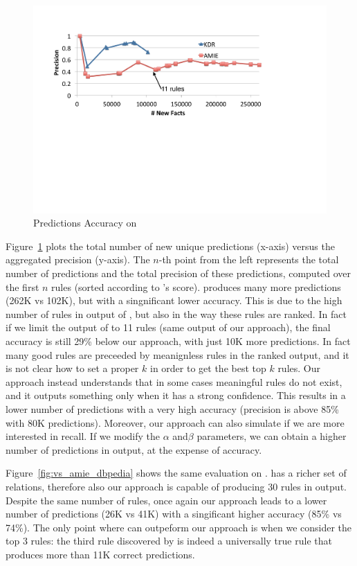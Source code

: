 \begin{figure}[t]
	\centering
	\includegraphics[width=\columnwidth]{include/figure/vsAmieYago.pdf}
	\caption{Predictions Accuracy on \yago}
	\label{fig:vs_amie_yago}
\end{figure}

Figure~\ref{fig:vs_amie_yago} plots the total number of new unique predictions (x-axis) versus the aggregated precision (y-axis). The $n$-th point from the left represents the total number of predictions and the total precision of these predictions, computed over the first $n$ rules (sorted according to \amie's score). \amie produces many more predictions (262K vs 102K), but with a singnificant lower accuracy. This is due to the high number of rules in output of \amie, but also in the way these rules are ranked. In fact if we limit the output of \amie to 11 rules (same output of our approach), the final accuracy is still 29\% below our approach, with just 10K more predictions. In fact many good rules are preceeded by meanignless rules in the ranked output, and it is not clear how to set a proper $k$ in order to get the best top $k$ rules. Our approach instead understands that in some cases meaningful rules do not exist, and it outputs something only when it has a strong confidence. This results in a lower number of predictions with a very high accuracy (precision is above 85\% with 80K predictions). Moreover, our approach can also simulate \amie if we are more interested in recall. If we modify the $\alpha$ and$\beta$ parameters, we can obtain a higher number of predictions in output, at the expense of accuracy. 

Figure~\ref{fig:vs_amie_dbpedia} shows the same evaluation on \dbpedia. \dbpedia has a richer set of relations, therefore also our approach is capable of producing 30 rules in output. Despite the same number of rules, once again our approach leads to a lower number of predictions (26K vs 41K) with a singificant higher accuracy (85\% vs 74\%). The only point where \amie can outpeform our approach is when we consider the top 3 rules: the third rule discovered by \amie is indeed a universally true rule that produces more than 11K correct predictions.

